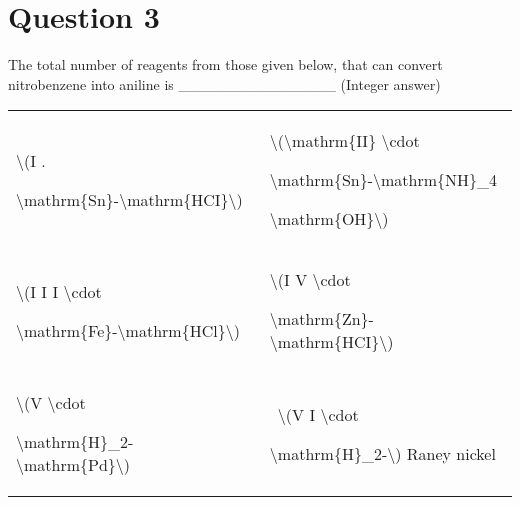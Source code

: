 \documentclass{article}
\begin{document}
\section*{Question 3}
The total number of reagents from those given below, that can convert nitrobenzene into aniline is _______________ (Integer answer)\begin{longtable}[]{@{}ll@{}}

\toprule\noalign{}

\endhead

\bottomrule\noalign{}

\endlastfoot

\textbackslash(I .

\textbackslash mathrm\{Sn\}-\textbackslash mathrm\{HCI\}\textbackslash)~

& \textbackslash(\textbackslash mathrm\{II\} \textbackslash cdot

\textbackslash mathrm\{Sn\}-\textbackslash mathrm\{NH\}\_4

\textbackslash mathrm\{OH\}\textbackslash)~ \\

\textbackslash(I I I \textbackslash cdot

\textbackslash mathrm\{Fe\}-\textbackslash mathrm\{HCl\}\textbackslash)~

& \textbackslash(I V \textbackslash cdot

\textbackslash mathrm\{Zn\}-\textbackslash mathrm\{HCI\}\textbackslash)~ \\

\textbackslash(V \textbackslash cdot

\textbackslash mathrm\{H\}\_2-\textbackslash mathrm\{Pd\}\textbackslash)~

& ~\textbackslash(V I \textbackslash cdot

\textbackslash mathrm\{H\}\_2-\textbackslash) Raney nickel \\

\end{longtable}


\begin{enumerate}[label=(\alph*)]
\end{enumerate}
\newpage
\end{document}
